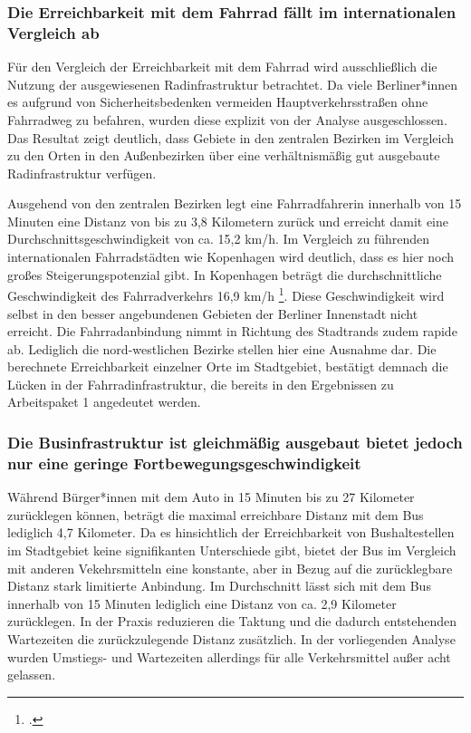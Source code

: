 \subsubsection{Die Erreichbarkeit mit dem Fahrrad fällt im internationalen Vergleich ab}

Für den Vergleich der Erreichbarkeit mit dem Fahrrad wird ausschließlich die Nutzung der ausgewiesenen Radinfrastruktur betrachtet. Da viele Berliner*innen es aufgrund von Sicherheitsbedenken vermeiden Hauptverkehrsstraßen ohne Fahrradweg zu befahren, wurden diese explizit von der Analyse ausgeschlossen. Das Resultat zeigt deutlich, dass Gebiete in den zentralen Bezirken im Vergleich zu den Orten in den Außenbezirken über eine verhältnismäßig gut ausgebaute Radinfrastruktur verfügen.


Ausgehend von den zentralen Bezirken legt eine Fahrradfahrerin innerhalb von 15 Minuten eine Distanz von bis zu 3,8 Kilometern zurück und erreicht damit eine Durchschnittsgeschwindigkeit von ca. 15,2 km/h. Im Vergleich zu führenden internationalen Fahrradstädten wie Kopenhagen wird deutlich, dass es hier noch großes Steigerungspotenzial gibt. In Kopenhagen beträgt die durchschnittliche Geschwindigkeit des Fahrradverkehrs 16,9 km/h \footcite{kopenhagen}.
Diese Geschwindigkeit wird selbst in den besser angebundenen Gebieten der Berliner Innenstadt nicht erreicht. Die Fahrradanbindung nimmt in Richtung des Stadtrands zudem rapide ab. Lediglich die nord-westlichen Bezirke stellen hier eine Ausnahme dar. Die berechnete Erreichbarkeit einzelner Orte im Stadtgebiet, bestätigt demnach die Lücken in der Fahrradinfrastruktur, die bereits in den Ergebnissen zu Arbeitspaket 1 angedeutet werden.

\subsubsection{Die Businfrastruktur ist gleichmäßig ausgebaut bietet jedoch nur eine geringe Fortbewegungsgeschwindigkeit}
Während Bürger*innen mit dem Auto in 15 Minuten bis zu 27 Kilometer zurücklegen können, beträgt die maximal erreichbare Distanz mit dem Bus lediglich 4,7 Kilometer. Da es hinsichtlich der Erreichbarkeit von Bushaltestellen im Stadtgebiet keine signifikanten Unterschiede gibt, bietet der Bus im Vergleich mit anderen Vekehrsmitteln eine konstante, aber in Bezug auf die zurücklegbare Distanz stark limitierte Anbindung. Im Durchschnitt lässt sich mit dem Bus innerhalb von 15 Minuten lediglich eine Distanz von ca. 2,9 Kilometer zurücklegen. In der Praxis reduzieren die Taktung und die dadurch entstehenden Wartezeiten die zurückzulegende Distanz zusätzlich. In der vorliegenden Analyse wurden Umstiegs- und Wartezeiten allerdings für alle Verkehrsmittel außer acht gelassen. 


